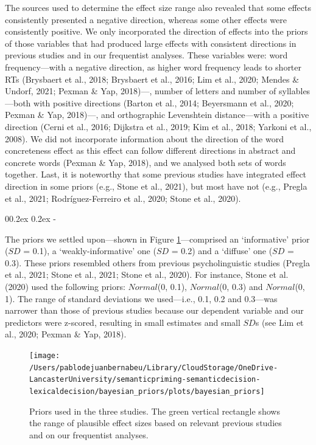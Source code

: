 \documentclass[
  12pt,
  man,floatsintext]{apa7}
\makeatletter
\let\oldsubparagraph\subparagraph
\renewcommand{\subparagraph}[1]{\oldsubparagraph{#1}\mbox{}}
\renewcommand{\subparagraph}[1]{\@startsection{subparagraph}{5}{1em}%
  {0\baselineskip \@plus 0.2ex \@minus 0.2ex}%
  {-\z@\relax}%
  {\normalfont\normalsize\itshape\hspace{\parindent}{#1}\textit{\addperi}}{\relax}}
\makeatother
\begin{document}
The sources used to determine the effect size range also revealed that some effects consistently presented a negative direction, whereas some other effects were consistently positive. We only incorporated the direction of effects into the priors of those variables that had produced large effects with consistent directions in previous studies and in our frequentist analyses. These variables were: word frequency---with a negative direction, as higher word frequency leads to shorter RTs (Brysbaert et al., 2018; Brysbaert et al., 2016; Lim et al., 2020; Mendes \& Undorf, 2021; Pexman \& Yap, 2018)---, number of letters and number of syllables---both with positive directions (Barton et al., 2014; Beyersmann et al., 2020; Pexman \& Yap, 2018)---, and orthographic Levenshtein distance---with a positive direction (Cerni et al., 2016; Dijkstra et al., 2019; Kim et al., 2018; Yarkoni et al., 2008). We did not incorporate information about the direction of the word concreteness effect as this effect can follow different directions in abstract and concrete words (Pexman \& Yap, 2018), and we analysed both sets of words together. Last, it is noteworthy that some previous studies have integrated effect direction in some priors (e.g., Stone et al., 2021), but most have not (e.g., Pregla et al., 2021; Rodríguez-Ferreiro et al., 2020; Stone et al., 2020).

\hypertarget{distributions-and-prior-predictive-checks}{%
\subparagraph{Distributions and prior predictive checks}\label{distributions-and-prior-predictive-checks}}

The priors we settled upon---shown in Figure \ref{fig:bayesian-priors}---comprised an `informative' prior (\(SD\) = 0.1), a `weakly-informative' one (\(SD\) = 0.2) and a `diffuse' one (\(SD\) = 0.3). These priors resembled others from previous psycholinguistic studies (Pregla et al., 2021; Stone et al., 2021; Stone et al., 2020). For instance, Stone et al. (2020) used the following priors: \(Normal\)(0, 0.1), \(Normal\)(0, 0.3) and \(Normal\)(0, 1). The range of standard deviations we used---i.e., 0.1, 0.2 and 0.3---was narrower than those of previous studies because our dependent variable and our predictors were z-scored, resulting in small estimates and small \(SD\)s (see Lim et al., 2020; Pexman \& Yap, 2018).

\begin{figure}

{\centering \texttt{[image: /Users/pablodejuanbernabeu/Library/CloudStorage/OneDrive-LancasterUniversity/semanticpriming-semanticdecision-lexicaldecision/bayesian\_priors/plots/bayesian\_priors]} 

}

\caption{Priors used in the three studies. The green vertical rectangle shows the range of plausible effect sizes based on relevant previous studies and on our frequentist analyses.}\label{fig:bayesian-priors}
\end{figure}
\end{document}
